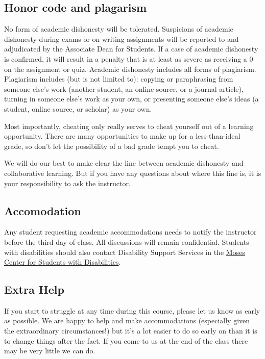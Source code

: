 \documentclass[
]{book}
\begin{document}
\hypertarget{honor-code-and-plagarism}{%
\subsection{Honor code and plagarism}\label{honor-code-and-plagarism}}

No form of academic dishonesty will be tolerated. Suspicions of academic dishonesty during exams or on writing assignments will be reported to and adjudicated by the Associate Dean for Students. If a case of academic dishonesty is confirmed, it will result in a penalty that is at least as severe as receiving a 0 on the assignment or quiz. Academic dishonesty includes all forms of plagiarism. Plagiarism includes (but is not limited to): copying or paraphrasing from someone else's work (another student, an online source, or a journal article), turning in someone else's work as your own, or presenting someone else's ideas (a student, online source, or scholar) as your own.

Most importantly, cheating only really serves to cheat yourself out of a learning opportunity. There are many opportunities to make up for a less-than-ideal grade, so don't let the possibility of a bad grade tempt you to cheat.

We will do our best to make clear the line between academic dishonesty and collaborative learning. But if you have any questions about where this line is, it is your responsibility to ask the instructor.

\hypertarget{accomodation}{%
\subsection{Accomodation}\label{accomodation}}

Any student requesting academic accommodations needs to notify the instructor before the third day of class. All discussions will remain confidential. Students with disabilities should also contact Disability Support Services in the \href{https://www.nyu.edu/students/communities-and-groups/student-accessibility.html}{Moses Center for Students with Disabilities}.

\hypertarget{extra-help}{%
\subsection{Extra Help}\label{extra-help}}

If you start to struggle at any time during this course, please let us know as early as possible. We are happy to help and make accommodations (especially given the extraordinary circumstances!) but it's a lot easier to do so early on than it is to change things after the fact. If you come to us at the end of the class there may be very little we can do.
\end{document}
